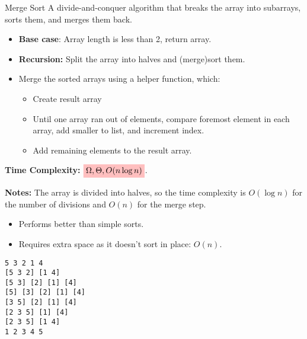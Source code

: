 \begin{definition}
    {Merge Sort}
    A divide-and-conquer algorithm that breaks the array into subarrays, sorts them, and merges them back.

    \begin{itemize}
        \item \textbf{Base case}: Array length is less than 2, return array.
        \item \textbf{Recursion:} Split the array into halves and (merge)sort them.
        \item Merge the sorted arrays using a helper function, which:
              \begin{itemize}
                  \item Create result array
                  \item Until one array ran out of elements, compare foremost element in each array, add smaller to list, and increment index.
                  \item Add remaining elements to the result array.
              \end{itemize}
    \end{itemize}

    \textbf{Time Complexity:} $\mathcolorbox{pink}{\Omega,\Theta,O(n \log n)}$.

    \textbf{Notes:} The array is divided into halves, so the time complexity is $O(\log n)$ for the number of divisions and $O(n)$ for the merge step.
    \begin{itemize}
        \item Performs better than simple sorts.
        \item Requires extra space as it doesn't sort in place: $O(n)$.
    \end{itemize}
    \tcblower
    \begin{lstlisting}
5 3 2 1 4
[5 3 2] [1 4]
[5 3] [2] [1] [4]
[5] [3] [2] [1] [4]
[3 5] [2] [1] [4]
[2 3 5] [1] [4]
[2 3 5] [1 4]
1 2 3 4 5\end{lstlisting}
\end{definition}

